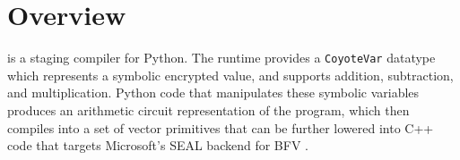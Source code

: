 \section{\system Overview}\label{sec:overview}
\system is a staging compiler for Python.
The runtime provides a \texttt{CoyoteVar} datatype which represents a symbolic encrypted value, and supports addition, subtraction, and multiplication.
Python code that manipulates these symbolic variables produces an arithmetic circuit representation of the program, which \system then compiles into a set of vector primitives that can be further lowered into C++ code that targets Microsoft's SEAL backend for BFV .


 
